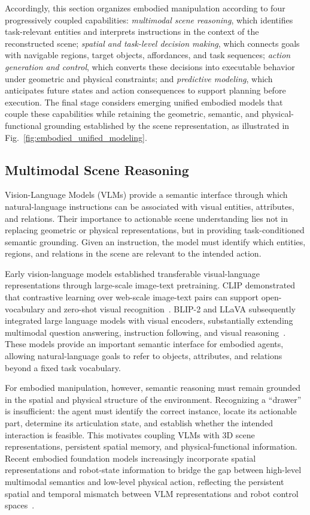 \documentclass{SCIS2026}
\begin{document}
Accordingly, this section organizes embodied manipulation according to four progressively coupled capabilities: \emph{multimodal scene reasoning}, which identifies task-relevant entities and interprets instructions in the context of the reconstructed scene; \emph{spatial and task-level decision making}, which connects goals with navigable regions, target objects, affordances, and task sequences; \emph{action generation and control}, which converts these decisions into executable behavior under geometric and physical constraints; and \emph{predictive modeling}, which anticipates future states and action consequences to support planning before execution. The final stage considers emerging unified embodied models that couple these capabilities while retaining the geometric, semantic, and physical-functional grounding established by the scene representation, as illustrated in Fig.~\ref{fig:embodied_unified_modeling}.
\subsection{Multimodal Scene Reasoning}
Vision-Language Models (VLMs) provide a semantic interface through which natural-language instructions can be associated with visual entities, attributes, and relations. Their importance to actionable scene understanding lies not in replacing geometric or physical representations, but in providing task-conditioned semantic grounding. Given an instruction, the model must identify which entities, regions, and relations in the scene are relevant to the intended action.

Early vision-language models established transferable visual-language representations through large-scale image-text pretraining. CLIP demonstrated that contrastive learning over web-scale image-text pairs can support open-vocabulary and zero-shot visual recognition~\cite{radford2021clip}. BLIP-2 and LLaVA subsequently integrated large language models with visual encoders, substantially extending multimodal question answering, instruction following, and visual reasoning~\cite{li2023blip,liu2023visual}. These models provide an important semantic interface for embodied agents, allowing natural-language goals to refer to objects, attributes, and relations beyond a fixed task vocabulary.

For embodied manipulation, however, semantic reasoning must remain grounded in the spatial and physical structure of the environment. Recognizing a ``drawer'' is insufficient: the agent must identify the correct instance, locate its actionable part, determine its articulation state, and establish whether the intended interaction is feasible. This motivates coupling VLMs with 3D scene representations, persistent spatial memory, and physical-functional information. Recent embodied foundation models increasingly incorporate spatial representations and robot-state information to bridge the gap between high-level multimodal semantics and low-level physical action, reflecting the persistent spatial and temporal mismatch between VLM representations and robot control spaces~\cite{zhen20243d}.
\end{document}
